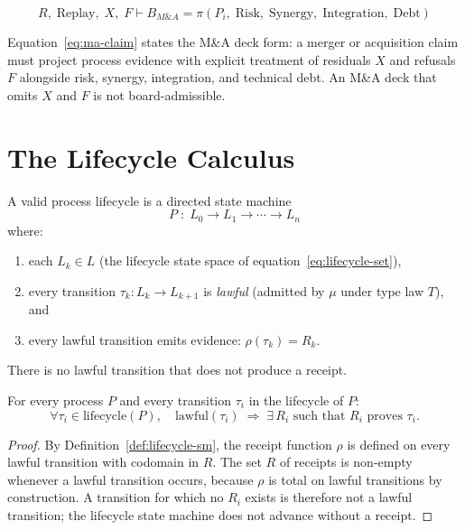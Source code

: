 \begin{equation}
\label{eq:ma-claim}
  R,\; \mathrm{Replay},\; X,\; F \vdash
  B_{M\&A} = \pi(P_i,\; \mathrm{Risk},\; \mathrm{Synergy},\;
              \mathrm{Integration},\; \mathrm{Debt})
\end{equation}

Equation~\eqref{eq:ma-claim} states the M\&A deck form: a merger or
acquisition claim must project process evidence with explicit treatment of
residuals $X$ and refusals $F$ alongside risk, synergy, integration, and
technical debt. An M\&A deck that omits $X$ and $F$ is not board-admissible.

\section{The Lifecycle Calculus}
\label{sec:pi-calculus}

\begin{definition}
\label{def:lifecycle-sm}
A valid process lifecycle is a directed state machine
\[
  P \;:\; L_0 \to L_1 \to \cdots \to L_n
\]
where:
\begin{enumerate}
  \item each $L_k \in L$ (the lifecycle state space of
    equation~\ref{eq:lifecycle-set}),
  \item every transition $\tau_k : L_k \to L_{k+1}$ is \emph{lawful} (admitted
    by $\mu$ under type law $T$), and
  \item every lawful transition emits evidence: $\rho(\tau_k) = R_k$.
\end{enumerate}
There is no lawful transition that does not produce a receipt.
\end{definition}

\begin{theorem}
\label{thm:receipt-law}
For every process $P$ and every transition $\tau_i$ in the lifecycle of $P$:
\[
  \forall \tau_i \in \mathrm{lifecycle}(P),\quad
  \mathrm{lawful}(\tau_i) \;\Rightarrow\;
  \exists\, R_i \text{ such that } R_i \text{ proves } \tau_i.
\]
\end{theorem}

\begin{proof}
By Definition~\ref{def:lifecycle-sm}, the receipt function $\rho$ is defined
on every lawful transition with codomain in $R$. The set $R$ of receipts is
non-empty whenever a lawful transition occurs, because $\rho$ is total on
lawful transitions by construction. A transition for which no $R_i$ exists
is therefore not a lawful transition; the lifecycle state machine does not
advance without a receipt.
\end{proof}

